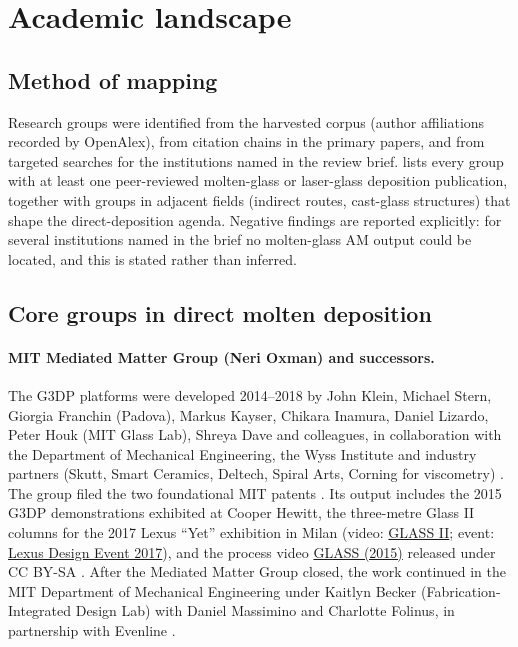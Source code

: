 \section{Academic landscape}
\label{sec:academic}

\subsection{Method of mapping}
Research groups were identified from the harvested corpus (author affiliations recorded by OpenAlex), from citation chains in the primary papers, and from targeted searches for the institutions named in the review brief.  lists every group with at least one peer-reviewed molten-glass or laser-glass deposition publication, together with groups in adjacent fields (indirect routes, cast-glass structures) that shape the direct-deposition agenda. Negative findings are reported explicitly: for several institutions named in the brief no molten-glass AM output could be located, and this is stated rather than inferred.

\subsection{Core groups in direct molten deposition}
\paragraph{MIT Mediated Matter Group (Neri Oxman) and successors.} The G3DP platforms were developed 2014--2018 by John Klein, Michael Stern, Giorgia Franchin (Padova), Markus Kayser, Chikara Inamura, Daniel Lizardo, Peter Houk (MIT Glass Lab), Shreya Dave and colleagues, in collaboration with the Department of Mechanical Engineering, the Wyss Institute and industry partners (Skutt, Smart Ceramics, Deltech, Spiral Arts, Corning for viscometry) \citep{klein2015,inamura2018,brun2017,oxman_platform,medialab_glass2}. The group filed the two foundational MIT patents \citep{patent_us10266442,patent_us9919510}. Its output includes the 2015 G3DP demonstrations exhibited at Cooper Hewitt, the three-metre Glass II columns for the 2017 Lexus ``Yet'' exhibition in Milan (video: \href{https://player.vimeo.com/video/211778198}{GLASS II}; event: \href{https://vimeo.com/215835768}{Lexus Design Event 2017}), and the process video \href{https://commons.wikimedia.org/wiki/File:Matter-glass-printer.webm}{GLASS (2015)} released under CC BY-SA \citep{video_glass1,video_glass2,video_lexus2017}. After the Mediated Matter Group closed, the work continued in the MIT Department of Mechanical Engineering under Kaitlyn Becker (Fabrication-Integrated Design Lab) with Daniel Massimino and Charlotte Folinus, in partnership with Evenline \citep{mit2024masonry,mitnews2024bricks}.

